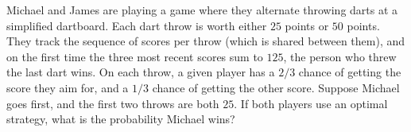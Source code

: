 Michael and James are playing a game where they alternate throwing darts at a simplified dartboard. Each dart throw is worth either $25$ points or $50$ points. They track the sequence of scores per throw (which is shared between them), and on the first time the three most recent scores sum to $125$, the person who threw the last dart wins. On each throw, a given player has a $2 / 3$ chance of getting the score they aim for, and a $1 / 3$ chance of getting the other score. Suppose Michael goes first, and the first two throws are both $25$. If both players use an optimal strategy, what is the probability Michael wins?